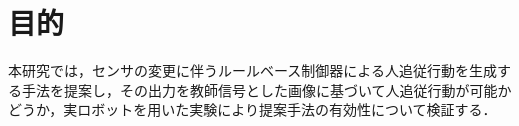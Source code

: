 
\section{目的}

  本研究では，センサの変更に伴うルールベース制御器による人追従行動を生成する手法を提案し，その出力を教師信号とした画像に基づいて人追従行動が可能かどうか，実ロボットを用いた実験により提案手法の有効性について検証する．

\newpage
